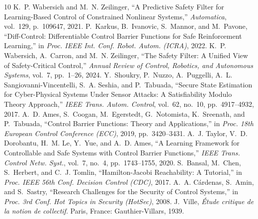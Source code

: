 \documentclass[conference]{IEEEtran}
\begin{document}
\begin{thebibliography}{10}
K.~P. Wabersich and M.~N. Zeilinger, ``A Predictive Safety Filter for Learning-Based Control of Constrained Nonlinear Systems,'' \emph{Automatica}, vol.~129, p.~109647, 2021.
P.~Karkus, B.~Ivanovic, S.~Mannor, and M.~Pavone, ``Diff-Control: Differentiable Control Barrier Functions for Safe Reinforcement Learning,'' in \emph{Proc. IEEE Int. Conf. Robot. Autom. (ICRA)}, 2022.
K.~P. Wabersich, A.~Carron, and M.~N. Zeilinger, ``The Safety Filter: A Unified View of Safety-Critical Control,'' \emph{Annual Review of Control, Robotics, and Autonomous Systems}, vol.~7, pp.~1--26, 2024.
Y.~Shoukry, P.~Nuzzo, A.~Puggelli, A.~L. Sangiovanni-Vincentelli, S.~A. Seshia, and P.~Tabuada, ``Secure State Estimation for Cyber-Physical Systems Under Sensor Attacks: A Satisfiability Modulo Theory Approach,'' \emph{IEEE Trans. Autom. Control}, vol.~62, no.~10, pp.~4917--4932, 2017.
A.~D. Ames, S.~Coogan, M.~Egerstedt, G.~Notomista, K.~Sreenath, and P.~Tabuada, ``Control Barrier Functions: Theory and Applications,'' in \emph{Proc. 18th European Control Conference (ECC)}, 2019, pp.~3420--3431.
A.~J. Taylor, V.~D. Dorobantu, H.~M. Le, Y.~Yue, and A.~D. Ames, ``A Learning Framework for Controllable and Safe Systems with Control Barrier Functions,'' \emph{IEEE Trans. Control Netw. Syst.}, vol.~7, no.~4, pp.~1743--1755, 2020.
S.~Bansal, M.~Chen, S.~Herbert, and C.~J. Tomlin, ``Hamilton-Jacobi Reachability: A Tutorial,'' in \emph{Proc. IEEE 56th Conf. Decision Control (CDC)}, 2017.
A.~A. C{\'a}rdenas, S.~Amin, and S.~Sastry, ``Research Challenges for the Security of Control Systems,'' in \emph{Proc. 3rd Conf. Hot Topics in Security (HotSec)}, 2008.
J.~Ville, \emph{\'Etude critique de la notion de collectif}. Paris, France: Gauthier-Villars, 1939.
\end{thebibliography}
\end{document}
